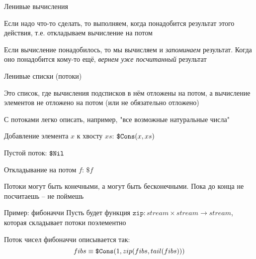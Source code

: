 \begin{frame}{Ленивые вычисления}

\begin{idea}
Если надо что-то сделать, то выполняем, когда понадобится результат этого действия, т.е. откладываем вычисление на потом
\end{idea}

\begin{idea}
Если вычисление понадобилось, то мы вычисляем и \emph{запоминаем} результат. Когда оно понадобится кому-то ещё, \emph{вернем уже посчитанный} результат
\end{idea}

\end{frame}

\begin{frame}{Ленивые списки (потоки)}
\begin{definition}
Это список, где вычисления подсписков в нём отложены на потом, а вычисление элементов не отложено на потом (или не обязательно отложено)
\end{definition}
С потоками легко описать, например, "все возможные натуральные числа"\vspace{1em}

\begin{notation}
Добавление элемента $x$ к хвосту $xs$: $\texttt{\$Cons}(x,xs)$

Пустой поток: $\texttt{\$Nil}$

Откладывание на потом $f$: $\texttt{\$}f$
\end{notation}
\begin{remark}
Потоки могут быть конечными, а могут быть бесконечными. Пока до конца не посчитаешь -- не поймешь
\end{remark}
\end{frame}

\begin{frame}{Пример: фибоначчи}
Пусть будет функция $\texttt{zip}: stream\times stream \rightarrow stream$, которая складывает потоки поэлементно

Поток чисел фибоначчи описывается так:
\[
fibs \equiv \texttt{\$Cons}(1,zip(fibs, tail(fibs)))
\]
\begin{center}

\end{center}
\end{frame}
